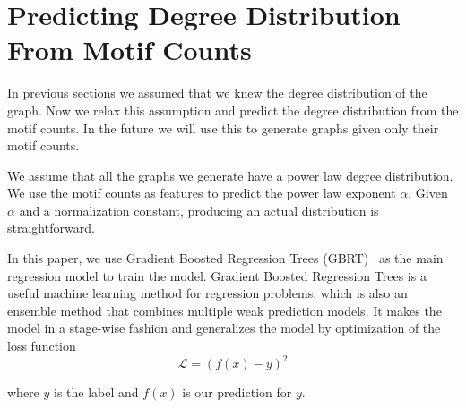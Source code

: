 \section{Predicting Degree Distribution From Motif Counts}
\label{sec:alpha}


In previous sections we assumed that we knew the degree distribution of the graph.  Now we relax this assumption and predict the degree distribution from the motif counts.  In the future we will use this to generate graphs given only their motif counts.

We assume that all the graphs we generate have a power law degree distribution.  We use the motif counts as features to predict the power law exponent $\alpha$.  Given $\alpha$ and a normalization constant, producing an actual distribution is straightforward.

In this paper, we use Gradient Boosted Regression Trees (GBRT)~\cite{friedman2002stochastic} as the main regression model to train the model. Gradient Boosted Regression Trees is a useful machine learning method for regression problems, which is also an ensemble method that combines multiple weak prediction models. It makes the model in a stage-wise fashion and generalizes the model by optimization of the loss function
\begin{equation}
\label{eqn:loss}
\mathcal{L} = (f(x) - y)^2
\end{equation}

where $y$ is the label and $f(x)$ is our prediction for $y$.

